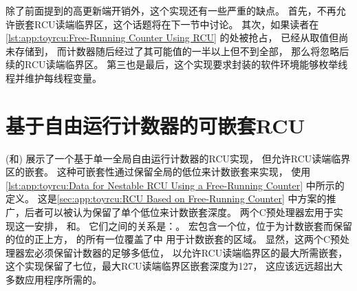 \begin{fcvref}
除了前面提到的高更新端开销外，这个实现还有一些严重的缺点。
首先，不再允许嵌套RCU读端临界区，这个话题将在下一节中讨论。
其次，如果读者在\cref{lst:app:toyrcu:Free-Running Counter Using RCU}
的处被抢占，
已经从取值但尚未存储到，
而计数器随后经过了其可能值的一半以上但不到全部，
那么将忽略后续的RCU读端临界区。
第三也是最后，这个实现要求封装的软件环境能够枚举线程并维护每线程变量。
\end{fcvref}

\QuickQuizEnd

\section{基于自由运行计数器的可嵌套RCU}
\label{sec:app:toyrcu:Nestable RCU Based on Free-Running Counter}

(和)
展示了一个基于单一全局自由运行计数器的RCU实现，
但允许RCU读端临界区的嵌套。
这种可嵌套性通过保留全局的低位来计数嵌套来实现，
使用\cref{lst:app:toyrcu:Data for Nestable RCU Using a Free-Running Counter}
中所示的定义。
这是\cref{sec:app:toyrcu:RCU Based on Free-Running Counter}
中方案的推广，后者可以被认为保留了单个低位来计数嵌套深度。
两个C预处理器宏用于实现这一安排，
和。
它们之间的关系是：。
宏包含一个位，位于为计数嵌套而保留的位的正上方，
的所有一位覆盖了中
用于计数嵌套的区域。
显然，这两个C预处理器宏必须保留计数器的足够多低位，
以允许RCU读端临界区的最大所需嵌套，
这个实现保留了七位，最大RCU读端临界区嵌套深度为127，
这应该远远超出大多数应用程序所需的。

